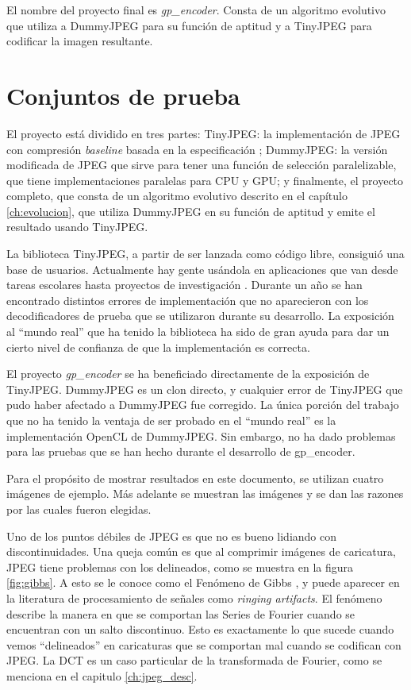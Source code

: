 El nombre del proyecto final es \emph{gp\_encoder}. Consta de un algoritmo
evolutivo que utiliza a DummyJPEG para su función de aptitud y a TinyJPEG
para codificar la imagen resultante.

\section{Conjuntos de prueba} \label{sec:testset}

El proyecto está dividido en tres partes: TinyJPEG: la implementación de JPEG
con compresión \emph{baseline} basada en la especificación \cite{jpeg-spec};
DummyJPEG: la versión modificada de JPEG que sirve para tener una función de
selección paralelizable, que tiene implementaciones paralelas para CPU y GPU; y
finalmente, el proyecto completo, que consta de un algoritmo evolutivo descrito
en el capítulo \ref{ch:evolucion}, que utiliza DummyJPEG en su función de
aptitud y emite el resultado usando TinyJPEG.


La biblioteca TinyJPEG, a partir de ser lanzada como código libre, consiguió
una base de usuarios. Actualmente hay gente usándola en aplicaciones que van
desde tareas escolares hasta proyectos de investigación \cite{humblebrag}.
Durante un año se han encontrado distintos errores de implementación que no
aparecieron con los decodificadores de prueba que se utilizaron durante su
desarrollo. La exposición al ``mundo real'' que ha tenido la biblioteca ha sido
de gran ayuda para dar un cierto nivel de confianza de que la implementación es
correcta.

El proyecto \emph{gp\_encoder} se ha beneficiado directamente de la exposición
de TinyJPEG. DummyJPEG es un clon directo, y cualquier error de TinyJPEG que
pudo haber afectado a DummyJPEG fue corregido. La única porción del trabajo que
no ha tenido la ventaja de ser probado en el ``mundo real'' es la implementación
OpenCL de DummyJPEG. Sin embargo, no ha dado problemas para las pruebas que se
han hecho durante el desarrollo de gp\_encoder.

Para el propósito de mostrar resultados en este documento, se utilizan cuatro
imágenes de ejemplo. Más adelante se muestran las imágenes y se dan las razones
por las cuales fueron elegidas.

Uno de los puntos débiles de JPEG es que no es bueno lidiando con
discontinuidades. Una queja común es que al comprimir imágenes de caricatura,
JPEG tiene problemas con los delineados, como se muestra en la figura
\ref{fig:gibbs}. A esto se le conoce como el Fenómeno de Gibbs \cite{gibbs}, y
puede aparecer en la literatura de procesamiento de señales como \emph{ringing
artifacts}. El fenómeno describe la manera en que se comportan las Series de
Fourier cuando se encuentran con un salto discontinuo. Esto es exactamente lo
que sucede cuando vemos ``delineados'' en caricaturas que se comportan mal
cuando se codifican con JPEG. La DCT es un caso particular de la transformada
de Fourier, como se menciona en el capitulo \ref{ch:jpeg_desc}.

